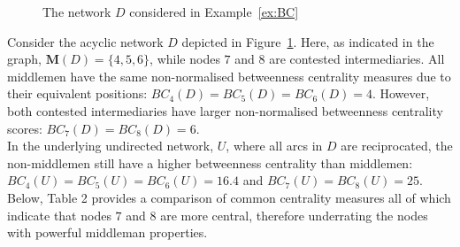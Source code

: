 \begin{figure}[h]
\begin{center}
\end{center}
\caption[Differentiating betweenness and middlemen]{The network $D$ considered in Example~\ref{ex:BC}}
\label{mmnmm}
\end{figure}

\begin{example} \label{ex:BC}
Consider the acyclic network $D$ depicted in Figure~\ref{mmnmm}. Here, as indicated in the graph, $\mathbf{M} (D) = \{ 4, 5, 6 \}$, while nodes $7$ and $8$ are contested intermediaries. All middlemen have the same non-normalised betweenness centrality measures due to their equivalent positions: $BC_{4}(D) = BC_{5}(D) = BC_{6}(D) = 4$. However, both contested intermediaries have larger non-normalised betweenness centrality scores: $BC_{7}(D)=BC_{8}(D)=6$.
\\
In the underlying undirected network, $U$, where all arcs in $D$ are reciprocated, the non-middlemen still have a higher betweenness centrality than middlemen: $BC_{4}(U)=BC_{5}(U)=BC_{6}(U)=16.4$ and $BC_{7}(U)=BC_{8}(U)=25$. Below, Table 2 provides a comparison of common centrality measures all of which indicate that nodes $7$ and $8$ are more central, therefore underrating the nodes with powerful middleman properties.
\end{example}

